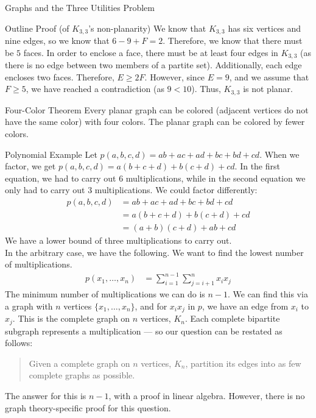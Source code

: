 \documentclass[8pt]{extarticle}
\begin{document}
{\begin{problem}{Graphs and the Three Utilities Problem}
\begin{problem}{Outline Proof (of $K_{3,3}$'s non-planarity)}
      We know that $K_{3,3}$ has six vertices and nine edges, so we know that $6-9+F = 2$. Therefore, we know that there must be $5$ faces. In order to enclose a face, there must be at least four edges in $K_{3,3}$ (as there is no edge between two members of a partite set). Additionally, each edge encloses two faces. Therefore, $E\geq 2F$. However, since $E = 9$, and we assume that $F\geq 5$, we have reached a contradiction (as $9<10$). Thus, $K_{3,3}$ is not planar.
    \end{problem}
    \begin{problem}{Four-Color Theorem}
      Every planar graph can be colored (adjacent vertices do not have the same color) with four colors. The planar graph can be colored by fewer colors.
    \end{problem}
    \begin{problem}{Polynomial Example}
      Let $p(a,b,c,d) = ab + ac + ad + bc +bd + cd$. When we factor, we get $p(a,b,c,d) = a(b+c+d) + b(c+d) + cd$. In the first equation, we had to carry out 6 multiplications, while in the second equation we only had to carry out 3 multiplications. We could factor differently:
      \begin{align*}
        p(a,b,c,d) &= ab + ac + ad + bc + bd + cd \\
                   &= a(b+c+d) + b(c+d) + cd\\
                   &= (a+b)(c+d) + ab + cd
      \end{align*}
      We have a lower bound of three multiplications to carry out.\\

      In the arbitrary case, we have the following. We want to find the lowest number of multiplications.
      \begin{align*}
        p(x_1,\dots,x_n) &= \sum_{i = 1}^{n-1}\sum_{j = i+1}^{n} x_ix_j
      \end{align*}
      \tcblower
      The minimum number of multiplications we can do is $n-1$. We can find this via a graph with $n$ vertices $\{x_1,\dots,x_n\}$, and for $x_ix_j$ in $p$, we have an edge from $x_i$ to $x_j$. This is the complete graph on $n$ vertices, $K_n$. Each complete bipartite subgraph represents a multiplication — so our question can be restated as follows:
      \begin{quote}
          Given a complete graph on $n$ vertices, $K_n$, partition its edges into as few complete graphs as possible.
      \end{quote}
      The answer for this is $n-1$, with a proof in linear algebra. However, there is no graph theory-specific proof for this question.
    \end{problem}
  \end{problem}
}
\end{document}
